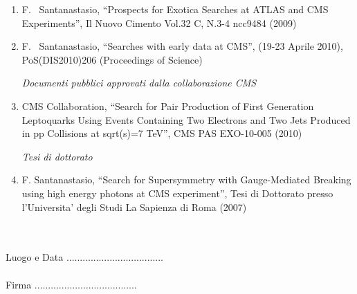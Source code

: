 \documentclass[10pt]{letter}
\begin{document}
\begin{enumerate}
\item F. ~Santanastasio, ``Prospects for Exotica Searches at ATLAS and CMS Experiments'', 
  Il Nuovo Cimento Vol.32 C, N.3-4 ncc9484 (2009)

\item F. ~Santanastasio, ``Searches with early data at CMS'', 
(19-23 Aprile 2010), PoS(DIS2010)206 (Proceedings of Science)

\begin{center} \textit{Documenti pubblici approvati dalla collaborazione CMS} \\ \end{center}

\item CMS Collaboration, 
  ``Search for Pair Production of First Generation Leptoquarks Using Events Containing Two Electrons and Two Jets Produced in pp Collisions at sqrt(s)=7 TeV'',
  CMS PAS EXO-10-005 (2010)

\begin{center} \textit{Tesi di dottorato} \\  \end{center}

\item F. Santanastasio, ``Search for Supersymmetry with Gauge-Mediated Breaking using high energy photons at CMS experiment'', Tesi di Dottorato presso l'Universita' degli Studi La Sapienza di Roma (2007)

\end{enumerate}

~\\
~\\
Luogo e Data .................................... \\ \\

Firma ......................................
\end{document}
